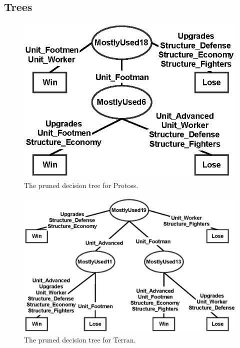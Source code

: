 \documentclass[a4paper,11pt]{article}
\begin{document}
\subsection{Trees}
  \begin{figure}[H]
    \centering
    \includegraphics[width=.95\linewidth]{tree_protoss}
    \caption{The pruned decision tree for Protoss.}
  \end{figure}
  \begin{figure}[H]
    \centering
    \includegraphics[width=.95\linewidth]{tree_terran}
    \caption{The pruned decision tree for Terran.}
  \end{figure}
\end{document}
